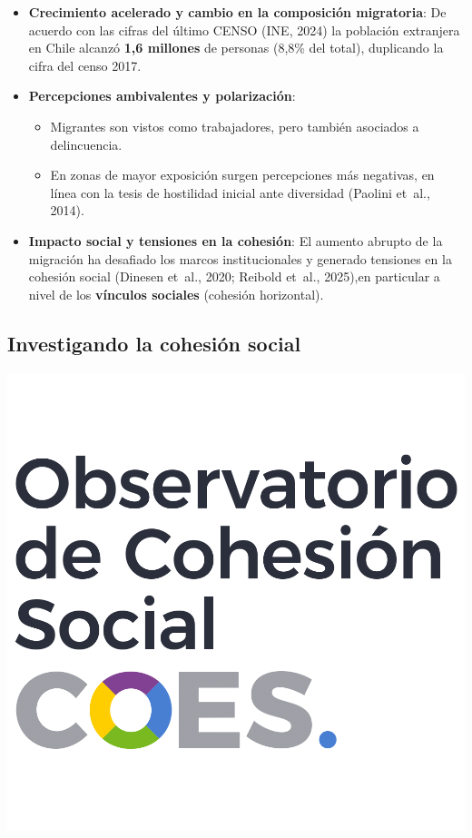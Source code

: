 \documentclass[
  spanish,
  letterpaper,
  DIV=11,
  numbers=noendperiod,
  oneside]{scrartcl}
\providecommand{\tightlist}{%
  \setlength{\itemsep}{0pt}\setlength{\parskip}{0pt}}
\begin{document}
\begin{itemize}
\item
  \textbf{Crecimiento acelerado y cambio en la composición migratoria}:
  De acuerdo con las cifras del último CENSO (INE, 2024) la población
  extranjera en Chile alcanzó \textbf{1,6 millones} de personas (8,8\%
  del total), duplicando la cifra del censo 2017.
\item
  \textbf{Percepciones ambivalentes y polarización}:

  \begin{itemize}
  \tightlist
  \item
    Migrantes son vistos como trabajadores, pero también asociados a
    delincuencia.
  \item
    En zonas de mayor exposición surgen percepciones más negativas, en
    línea con la tesis de hostilidad inicial ante diversidad (Paolini
    et~al., 2014).
  \end{itemize}
\item
  \textbf{Impacto social y tensiones en la cohesión}: El aumento abrupto
  de la migración ha desafiado los marcos institucionales y generado
  tensiones en la cohesión social (Dinesen et~al., 2020; Reibold et~al.,
  2025),en particular a nivel de los \textbf{vínculos sociales}
  (cohesión horizontal).
\end{itemize}

\subsection{Investigando la cohesión
social}\label{investigando-la-cohesiuxf3n-social}

\hfill
\includegraphics[width=1\linewidth,height=\textheight,keepaspectratio]{images/LOGO-OCS.png}
\end{document}
